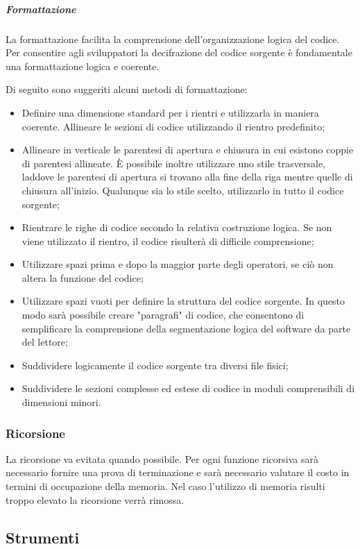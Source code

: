 \subparagraph{Formattazione}
La formattazione facilita la comprensione dell'organizzazione logica del codice. Per consentire agli sviluppatori la decifrazione del codice sorgente è fondamentale una formattazione logica e coerente.

Di seguito sono suggeriti alcuni metodi di formattazione:
\begin{itemize}
\item
Definire una dimensione standard per i rientri e utilizzarla in maniera coerente. Allineare le sezioni di codice utilizzando il rientro predefinito;
\item
Allineare in verticale le parentesi di apertura e chiusura in cui esistono coppie di parentesi allineate. È possibile inoltre utilizzare uno stile trasversale, laddove le parentesi di apertura si trovano alla fine della riga mentre quelle di chiusura all'inizio. Qualunque sia lo stile scelto, utilizzarlo in tutto il codice sorgente;
\item
Rientrare le righe di codice secondo la relativa costruzione logica. Se non viene utilizzato il rientro, il codice risulterà di difficile comprensione;
\item
Utilizzare spazi prima e dopo la maggior parte degli operatori, se ciò non altera la funzione del codice;
\item
Utilizzare spazi vuoti per definire la struttura del codice sorgente. In questo modo sarà possibile creare "paragrafi" di codice, che consentono di semplificare la comprensione della segmentazione logica del software da parte del lettore;
\item
Suddividere logicamente il codice sorgente tra diversi file fisici;
\item
Suddividere le sezioni complesse ed estese di codice in moduli comprensibili di dimensioni minori.
\end{itemize}

\subsubsection{Ricorsione}
La ricorsione va evitata quando possibile. Per ogni funzione ricorsiva sarà necessario fornire una prova di terminazione e sarà necessario valutare il costo in termini di occupazione della memoria. Nel caso l'utilizzo di memoria risulti troppo elevato la ricorsione verrà rimossa.

\subsection{Strumenti}

